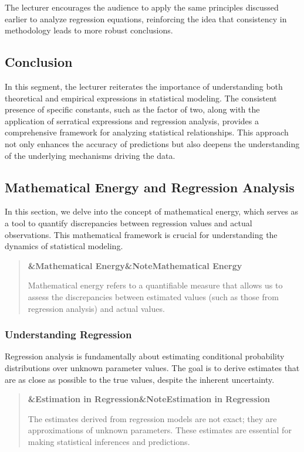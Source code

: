 \documentclass[a4paper]{article}
\newcommand{\boxheading}[1]{%
  \par\smallskip
  \noindent\textbf{\ifx&#1&Note\else#1\fi}\par
  \smallskip
}
\newenvironment{defbox}[1][]{%
  \begin{quote}\color{green!40!black}\boxheading{#1}\normalcolor
}{\end{quote}}
\newenvironment{rembox}[1][]{%
  \begin{quote}\color{black!70}\boxheading{#1}\normalcolor
}{\end{quote}}
\begin{document}
The lecturer encourages the audience to apply the same principles discussed earlier to analyze regression equations, reinforcing the idea that consistency in methodology leads to more robust conclusions.

\subsection{Conclusion}
In this segment, the lecturer reiterates the importance of understanding both theoretical and empirical expressions in statistical modeling. The consistent presence of specific constants, such as the factor of two, along with the application of serratical expressions and regression analysis, provides a comprehensive framework for analyzing statistical relationships. This approach not only enhances the accuracy of predictions but also deepens the understanding of the underlying mechanisms driving the data.

\subsection{Mathematical Energy and Regression Analysis}
In this section, we delve into the concept of mathematical energy, which serves as a tool to quantify discrepancies between regression values and actual observations. This mathematical framework is crucial for understanding the dynamics of statistical modeling.

\begin{defbox}[Mathematical Energy]
Mathematical energy refers to a quantifiable measure that allows us to assess the discrepancies between estimated values (such as those from regression analysis) and actual values. 
\end{defbox}

\subsubsection{Understanding Regression}
Regression analysis is fundamentally about estimating conditional probability distributions over unknown parameter values. The goal is to derive estimates that are as close as possible to the true values, despite the inherent uncertainty.

\begin{rembox}[Estimation in Regression]
The estimates derived from regression models are not exact; they are approximations of unknown parameters. These estimates are essential for making statistical inferences and predictions.
\end{rembox}
\end{document}
